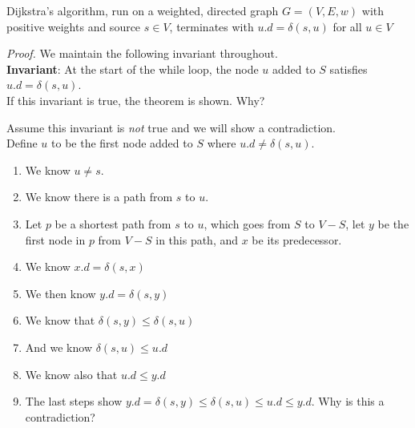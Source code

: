 \documentclass[11  pt]{exam}
\begin{document}
	
	\begin{theorem}
		Dijkstra's algorithm, run on a weighted, directed graph $G = (V,E,w)$ with positive weights and source $s \in V$, terminates with $u.d = \delta(s,u)$ for all $u \in V$
	\end{theorem}
	\textit{Proof.} We maintain the following invariant throughout. \\
	
	\textbf{Invariant}: At the start of the while loop, the node $u$ added to $S$ satisfies $u.d = \delta(s,u)$. \\
	
	If this invariant is true, the theorem is shown. Why?
	\newpage
	
	Assume this invariant is \emph{not} true and we will show a contradiction. \\
	
	Define $u$ to be the first node added to $S$ where $u.d \neq \delta(s,u)$.
	
	\begin{enumerate}
		\item We know $u \neq s$. \\
		\item We know there is a path from $s$ to $u$. \\
		\item Let $p$ be a shortest path from $s$ to $u$, which goes from $S$ to $V-S$, let $y$ be the first node in $p$ from $V-S$ in this path, and $x$ be its predecessor. \\ 
		\vs{4cm} 
		\item We know $x.d = \delta(s,x)$\\
		\item We then know $y.d = \delta(s,y)$ \\
		\item We know that $\delta(s,y) \leq \delta(s,u)$ \\
		
		\item And we know $\delta(s,u) \leq u.d$ \\
		\item We know also that $u.d \leq y.d$ \\
		\item The last steps show $y.d = \delta(s,y) \leq \delta(s,u) \leq u.d \leq y.d$. Why is this a contradiction?
	\end{enumerate}
	
	\newpage
	
	
\end{document}

